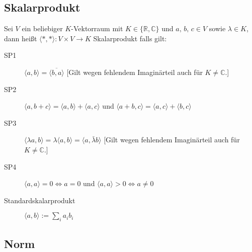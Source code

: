 \subsection{Skalarprodukt}
Sei $V$ ein beliebiger $K$-Vektorraum mit $K\in\{\mathbb{R},\mathbb{C}\}$ und $a,\, b,\, c\in V$ sowie $\lambda\in K$, dann heißt $\langle \ast,\ast \rangle : V\times V\to K$ Skalarprodukt falls gilt:
\begin{description}
  \item [{SP1}]
	$\langle a,b\rangle =\overline{\langle b,a\rangle}$
	[Gilt wegen fehlendem Imaginärteil auch für $K\ne\mathbb{C}$.]
  \item [{SP2}]
	$\langle a,b+c\rangle =\langle a,b\rangle +\langle a,c\rangle $
	und $\langle a+b,c\rangle =\langle a,c\rangle +\langle b,c\rangle $
  \item [{SP3}]
	$\langle \lambda a,b\rangle =\lambda\langle a,b\rangle =\langle a,\bar{\lambda}b\rangle $
	[Gilt wegen fehlendem Imaginärteil auch für $K\ne\mathbb{C}$.]
  \item [{SP4}]
	$\langle a,a \rangle = 0 \iff a=0$
	und $\langle a,a \rangle > 0 \iff a\ne0$
  \item [{Standardskalarprodukt}] $\langle a,b \rangle := \sum_i a_i b_i$
\end{description}

\subsection{\label{sub:Vektornorm}Norm}

